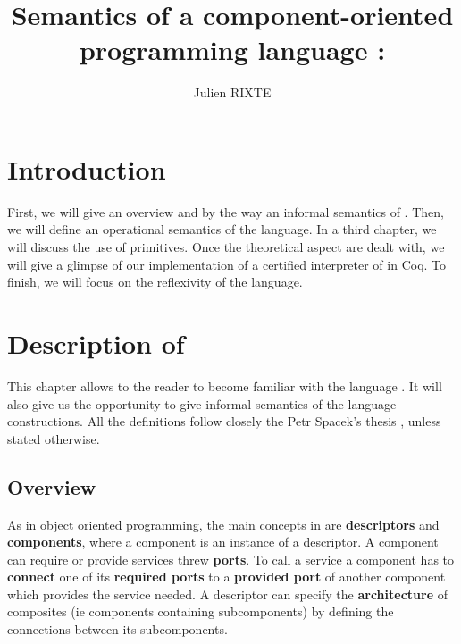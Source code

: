  



\title{Semantics of a component-oriented programming language : \compo{}}
\author{Julien RIXTE}
\maketitle

\setcounter{tocdepth}{1}	
\tableofcontents



\lstset{language=Compo}

\newtheorem{prop}{Proposition}
\newtheorem{defi}{Definition}
\newtheorem{inv}{Invariant}


\chapter{Introduction}

First, we will give an overview and by the way an informal semantics of \compo{}. Then, we will define an operational semantics of the language. In a third chapter, we will discuss the use of primitives. Once the theoretical aspect are dealt with, we will give a glimpse of our implementation of a certified interpreter of \compo{} in Coq. To finish, we will focus on the reflexivity of the language.


\chapter{Description of \compo{}}

This chapter allows to the reader to become familiar with the language \compo{}. It will also give us the opportunity to give informal semantics of the language constructions. All the definitions follow closely the Petr Spacek's thesis \cite{Spa13}, unless stated otherwise.

\section{Overview}
As in object oriented programming, the main concepts in \compo{} are \textbf{descriptors} and \textbf{components}, where a component is an instance of a descriptor. A component can require or provide services  threw \textbf{ports}. To call a service a component has to \textbf{connect}  one of its \textbf{required ports} to a \textbf{provided port} of another component which provides the service needed. A descriptor can specify the \textbf{architecture} of composites (ie components containing subcomponents) by defining the connections between its subcomponents.


